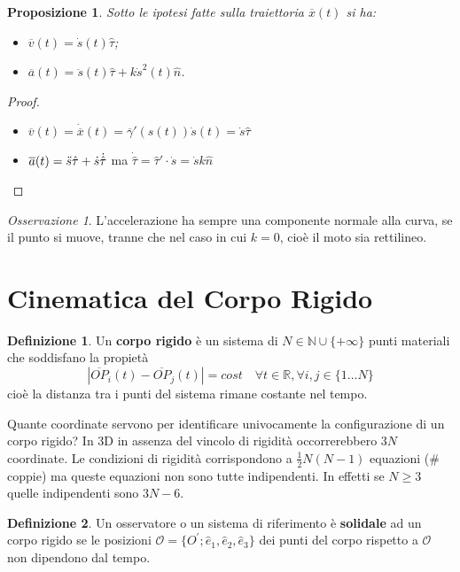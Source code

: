 \documentclass{book}
\theoremstyle{plain}
\theoremstyle{plain}
\theoremstyle{plain}
\theoremstyle{plain}
\theoremstyle{plain}
\newtheorem{prop}{Proposizione}[chapter]
\theoremstyle{definition}
\newtheorem{defi}{Definizione}[chapter]
\theoremstyle{remark}
\newtheorem*{oss}{Osservazione}
\theoremstyle{definition}
\begin{document}
\begin{prop}
    Sotto le ipotesi fatte sulla traiettoria $\overline{x}(t)$ si ha:
    \begin{itemize}
        \item $\overline{v}(t)=\dot{s}(t)\hat{\tau}$;
        \item $\overline{a}(t)=\ddot{s}(t) \hat{\tau}+k \dot{s}^{2}(t) \hat{n}$.
    \end{itemize}
\end{prop}

\begin{proof}

    \noindent
    \begin{itemize}
        \item $\overline{v}(t)=\Dot{\overline{x}}(t)=\overline{\gamma}'(s(t))\Dot{s}(t)=\Dot{s}\hat{\tau}$
        \item $\overline{a}(t)=\Ddot{s}\hat{\tau}+\Dot{s}\Dot{\hat{\tau}}$ ma $\Dot{\hat{\tau}}=\hat{\tau}'\cdot\Dot{s}=\Dot{s}k\hat{n}$
    \end{itemize}
\end{proof}

\begin{oss}
    L'accelerazione ha sempre una componente normale alla curva, se il punto si muove, tranne che nel caso in cui $k = 0$, cioè il moto sia rettilineo.
\end{oss}

\section{Cinematica del Corpo Rigido}

\begin{defi}
    Un \textbf{corpo rigido} è un sistema di $N \in \mathbb{N} \cup\{+\infty\}$ punti materiali che soddisfano la propietà
    \begin{displaymath}
        \left|\overline{OP}_{i}(t)-\overline{OP}_{j}(t)\right| = cost \quad \forall t \in \mathbb{R}, \forall i, j \in\{1 \ldots N\}
    \end{displaymath}
    cioè la distanza tra i punti del sistema rimane costante nel tempo.
\end{defi}

\noindent Quante coordinate servono per identificare univocamente la configurazione di un corpo rigido? In 3D in assenza del vincolo di rigidità occorrerebbero $3N$ coordinate. Le condizioni di rigidità corrispondono a $\frac{1}{2}N(N-1)$ equazioni (\# coppie) ma queste equazioni non sono tutte indipendenti. In effetti se $N \geq 3$ quelle indipendenti sono $3N-6$.
\begin{defi}
    Un osservatore o un sistema di riferimento è \textbf{solidale} ad un corpo rigido se le posizioni $\mathcal{O}=\{O^{\prime}; \hat{e}_1, \hat{e}_2, \hat{e}_3\}$ dei punti del corpo rispetto a $\mathcal{O}$ non dipendono dal tempo.
\end{defi}
\end{document}
